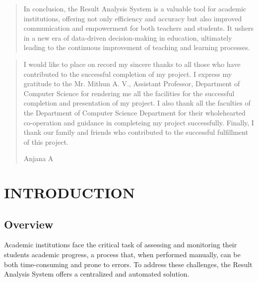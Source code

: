 \documentclass{nascproject}
\begin{document}
\begin{abstract}
In conclusion, the Result Analysis System is a valuable tool for academic institutions, offering not only efficiency and accuracy but also improved communication and empowerment for both teachers and students. It ushers in a new era of data-driven decision-making in education, ultimately leading to the continuous improvement of teaching and learning processes.
\end{abstract}
\newpage
\renewcommand\abstractname{ACKNOWLEDGMENT}
\begin{abstract}
\vspace{5cm}
I would like to place on record my sincere thanks to all those who have contributed to the successful completion of my project. I express my gratitude to the Mr. Mithun A. V., Assistant Professor, Department of Computer Science for rendering me all the facilities for the successful completion and presentation of my project. I also thank all the faculties of the Department of Computer Science Department for their wholehearted co-operation and guidance in completeing my project successfully. Finally, I thank our family and  friends who contributed to the successful fulfillment of this project.
\vspace{1cm}
\begin{flushright}
Anjana A
\end{flushright}
\end{abstract}
\newpage

\restoregeometry
\tableofcontents
\newpage

\cleardoublepage
{}
\listoffigures
\newpage

\cleardoublepage
{}
\listoftables
\newpage
\pagestyle{fancy}


\chapter{INTRODUCTION}
\setcounter{page}{1}
\renewcommand{\baselinestretch}{1.50}
\section{Overview}

Academic institutions face the critical task of assessing and monitoring their students academic progress, a process that, when performed manually, can be both time-consuming and prone to errors. To address these challenges, the Result Analysis System offers a centralized and automated solution.
\end{document}
